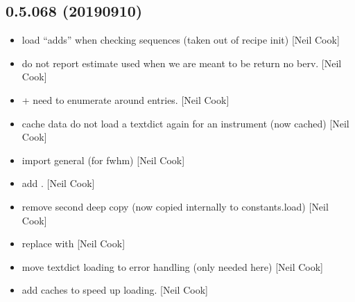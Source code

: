\documentclass[a4paper,10pt,english]{report}
\begin{document}
\subsection{0.5.068 (2019\sphinxhyphen{}09\sphinxhyphen{}10)}
\label{\detokenize{misc/changelog:id93}}\begin{itemize}
\item {} 
 \sphinxhyphen{} load “adds” when checking
sequences (taken out of recipe init) {[}Neil Cook{]}

\item {} 
 \sphinxhyphen{} do not report estimate used when we are
meant to be return no berv. {[}Neil Cook{]}

\item {} 
 +  \sphinxhyphen{} need to
enumerate around entries. {[}Neil Cook{]}

\item {} 
 \sphinxhyphen{} cache data \sphinxhyphen{} do not load a textdict again
for an instrument (now cached) {[}Neil Cook{]}

\item {} 
 \sphinxhyphen{} import general (for fwhm) {[}Neil Cook{]}

\item {} 
 \sphinxhyphen{} add . {[}Neil
Cook{]}

\item {} 
 \sphinxhyphen{} remove second deep copy (now copied internally to
constants.load) {[}Neil Cook{]}

\item {} 
 \sphinxhyphen{} replace  with 
{[}Neil Cook{]}

\item {} 
 \sphinxhyphen{} move textdict loading to error handling
(only needed here) {[}Neil Cook{]}

\item {} 
 \sphinxhyphen{} add caches to speed up loading.
{[}Neil Cook{]}


\end{itemize}
\end{document}
